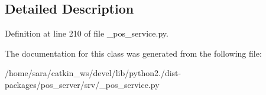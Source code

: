 \subsection{Detailed Description}


Definition at line 210 of file \+\_\+pos\+\_\+service.\+py.



The documentation for this class was generated from the following file\+:\begin{DoxyCompactItemize}
\item 
/home/sara/catkin\+\_\+ws/devel/lib/python2./dist-\/packages/pos\+\_\+server/srv/\+\_\+pos\+\_\+service.\+py\end{DoxyCompactItemize}
